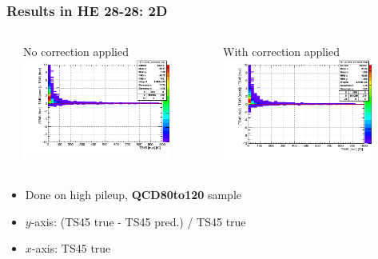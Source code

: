 \documentclass[bigger]{beamer}
\providecommand{\alert}[1]{\textbf{#1}}
\begin{document}
\begin{frame}
\frametitle{Results in HE 28-28: 2D}
\label{sec-3-3-21}
\begin{columns} %
\label{sec-3-3-21-1}
\begin{column}{0.55\textwidth}
\label{sec-3-3-21-1-1}

\centering
No correction applied
\includegraphics[width=0.8\textwidth]{fig/delta_uncorrected_QCD80to120_ring_5.png}
\end{column}
\begin{column}{0.55\textwidth}
\label{sec-3-3-21-1-2}

\centering
With correction applied
\includegraphics[width=0.8\textwidth]{fig/delta_corrected_QCD80to120_ring_5.png}
\end{column}
\end{columns}
\label{sec-3-3-21-2}
\begin{itemize}

\item Done on high pileup, \alert{QCD80to120} sample
\label{sec-3-3-21-2-1}%

\item $y$-axis: (TS45 true - TS45 pred.) / TS45 true
\label{sec-3-3-21-2-2}%

\item $x$-axis: TS45 true
\label{sec-3-3-21-2-3}%

\end{itemize} %
\end{frame}
\end{document}
